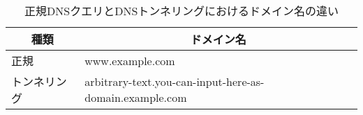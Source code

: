 \begin{table}[th]
 \caption{正規DNSクエリとDNSトンネリングにおけるドメイン名の違い}
 \centering
  \begin{tabular}{l|l}
    \toprule
		\multicolumn{1}{c}{\textbf{種類}} & \multicolumn{1}{c}{\textbf{ドメイン名}} \\
    \midrule
    正規 &  www.example.com \\ \hline
    トンネリング & arbitrary-text.you-can-input-here-as-domain.example.com\\
    \bottomrule
  \end{tabular}
 \label{tab:feature-tunnel}
\end{table}
